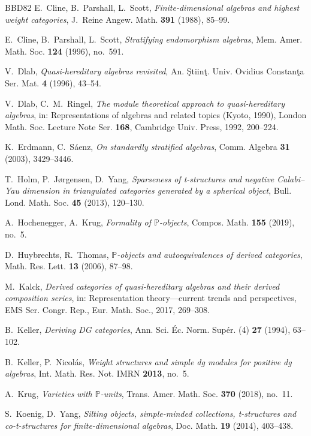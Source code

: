 \documentclass[11pt,reqno]{amsart}
\theoremstyle{plain}
\theoremstyle{definition}
\theoremstyle{remark}
\begin{document}
\begin{thebibliography}{BBD82}
E.~Cline, B.~Parshall, L.~Scott, \emph{Finite-dimensional algebras and highest weight categories}, J.~Reine Angew. Math. \textbf{391} (1988), 85--99.

E.~Cline, B.~Parshall, L.~Scott, \emph{Stratifying endomorphism algebras}, Mem. Amer. Math. Soc. \textbf{124} (1996), no.~591.

V.~Dlab, \emph{Quasi-hereditary algebras revisited}, An. \c{S}tiin\c{t}. Univ. Ovidius Constan\c{t}a Ser. Mat. \textbf{4} (1996), 43--54.

V.~Dlab, C.~M.~Ringel, \emph{The module theoretical approach to quasi-hereditary algebras}, in: Representations of algebras and related topics (Kyoto, 1990), London Math. Soc. Lecture Note Ser. \textbf{168}, Cambridge Univ. Press, 1992, 200--224.

K.~Erdmann, C.~S\'aenz, \emph{On standardly stratified algebras}, Comm. Algebra \textbf{31} (2003), 3429--3446.

T.~Holm, P.~J\o rgensen, D.~Yang, \emph{Sparseness of t-structures and negative Calabi--Yau dimension in triangulated categories generated by a spherical object}, Bull. Lond. Math. Soc. \textbf{45} (2013), 120--130.

A.~Hochenegger, A.~Krug, \emph{Formality of $\mathbb{P}$-objects}, Compos. Math. \textbf{155} (2019), no.~5.

D.~Huybrechts, R.~Thomas, \emph{$\mathbb{P}$-objects and autoequivalences of derived categories}, Math. Res. Lett. \textbf{13} (2006), 87--98.

M.~Kalck, \emph{Derived categories of quasi-hereditary algebras and their derived composition series}, in: Representation theory---current trends and perspectives, EMS Ser. Congr. Rep., Eur. Math. Soc., 2017, 269--308.

B.~Keller, \emph{Deriving DG categories}, Ann. Sci. \'Ec. Norm. Sup\'er. (4) \textbf{27} (1994), 63--102.

B.~Keller, P.~Nicol\'as, \emph{Weight structures and simple dg modules for positive dg algebras}, Int. Math. Res. Not. IMRN \textbf{2013}, no.~5.

A.~Krug, \emph{Varieties with $\mathbb{P}$-units}, Trans. Amer. Math. Soc. \textbf{370} (2018), no.~11.

S.~Koenig, D.~Yang, \emph{Silting objects, simple-minded collections, t-structures and co-t-structures for finite-dimensional algebras}, Doc. Math. \textbf{19} (2014), 403--438.


\end{thebibliography}
\end{document}
